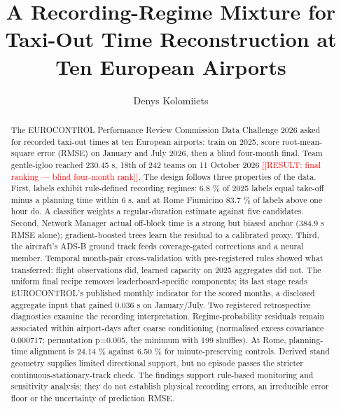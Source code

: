 \documentclass[
  manuscript=article,  %
  layout=preprint,     %
  year=2026,
  volume=4,
]{extra/joas}
\title{A Recording-Regime Mixture for Taxi-Out Time Reconstruction at Ten European Airports}
\author{Denys Kolomiiets \orcid{0000-0003-3212-3251}}
\affiliation{Independent researcher, team gentle-igloo}
\newcommand{\placeholder}[1]{\textcolor{red}{[[RESULT:#1]]}}
\begin{document}

\begin{abstract}
The EUROCONTROL Performance Review Commission Data Challenge 2026 asked for recorded taxi-out times at ten European airports: train on 2025, score root-mean-square error (RMSE) on January and July 2026, then a blind four-month final. Team gentle-igloo reached 230.45 s, 18th of 242 teams on 11 October 2026 \placeholder{ final ranking --- blind four-month rank}. The design follows three properties of the data. First, labels exhibit rule-defined recording regimes: 6.8 \% of 2025 labels equal take-off minus a planning time within 6 s, and at Rome Fiumicino 83.7 \% of labels above one hour do. A classifier weights a regular-duration estimate against five candidates. Second, Network Manager actual off-block time is a strong but biased anchor (384.9 s RMSE alone); gradient-boosted trees learn the residual to a calibrated proxy. Third, the aircraft's ADS-B ground track feeds coverage-gated corrections and a neural member. Temporal month-pair cross-validation with pre-registered rules showed what transferred: flight observations did, learned capacity on 2025 aggregates did not. The uniform final recipe removes leaderboard-specific components; its last stage reads EUROCONTROL's published monthly indicator for the scored months, a disclosed aggregate input that gained 0.036 s on January/July. Two registered retrospective diagnostics examine the recording interpretation. Regime-probability residuals remain associated within airport-days after coarse conditioning (normalised excess covariance 0.000717; permutation p=0.005, the minimum with 199 shuffles). At Rome, planning-time alignment is 24.14 \% against 6.50 \% for minute-preserving controls. Derived stand geometry supplies limited directional support, but no episode passes the stricter continuous-stationary-track check. The findings support rule-based monitoring and sensitivity analysis; they do not establish physical recording errors, an irreducible error floor or the uncertainty of prediction RMSE.
\end{abstract}
\end{document}

